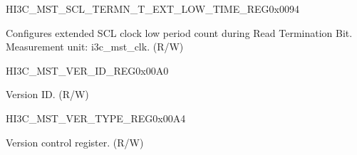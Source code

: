 \begin{register}{H}{I3C\_MST\_SCL\_TERMN\_T\_EXT\_LOW\_TIME\_REG}{0x0094}\label{regdesc:I3CMSTSCLTERMNTEXTLOWTIMEREG}
%
%
\regnewline%
\begin{regdesc}\begin{reglist}
\label{fielddesc:I3CMSTREGI3CMSTTERMNTEXTLOWTIME}\item [I3C\_MST\_REG\_I3C\_MST\_TERMN\_T\_EXT\_LOW\_TIME] Configures extended SCL clock low period count during Read Termination Bit.\\
Measurement unit: i3c\_mst\_clk. (R/W)
\end{reglist}\end{regdesc}
\end{register}


\begin{register}{H}{I3C\_MST\_VER\_ID\_REG}{0x00A0}\label{regdesc:I3CMSTVERIDREG}
%
\regnewline%
\begin{regdesc}\begin{reglist}
\label{fielddesc:I3CMSTREGI3CMSTVERID}\item [I3C\_MST\_REG\_I3C\_MST\_VER\_ID] Version ID. (R/W)
\end{reglist}\end{regdesc}
\end{register}


\begin{register}{H}{I3C\_MST\_VER\_TYPE\_REG}{0x00A4}\label{regdesc:I3CMSTVERTYPEREG}
%
\regnewline%
\begin{regdesc}\begin{reglist}
\label{fielddesc:I3CMSTREGI3CMSTVERTYPE}\item [I3C\_MST\_REG\_I3C\_MST\_VER\_TYPE] Version control register. (R/W)
\end{reglist}\end{regdesc}
\end{register}
